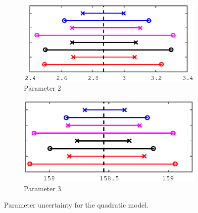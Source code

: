 \documentclass[11pt,a4paper,oneside]{report}
\begin{document}
\begin{figure}
  \begin{subfigure}[b]{0.5\textwidth}
    \includegraphics[width=\textwidth, trim=0 0 0 0,clip=true]{figures/task5/uncert_model2_param2.eps}
    \caption{Parameter 2}
  \end{subfigure}%
  \begin{subfigure}[b]{0.5\textwidth}
    \includegraphics[width=\textwidth, trim=0 0 0 0,clip=true]{figures/task5/uncert_model2_param3.eps}
    \caption{Parameter 3}
  \end{subfigure}%
  
  \caption{Parameter uncertainty for the quadratic model.}
  \label{fig:c5uncertM2}
  
\end{figure}
\end{document}
